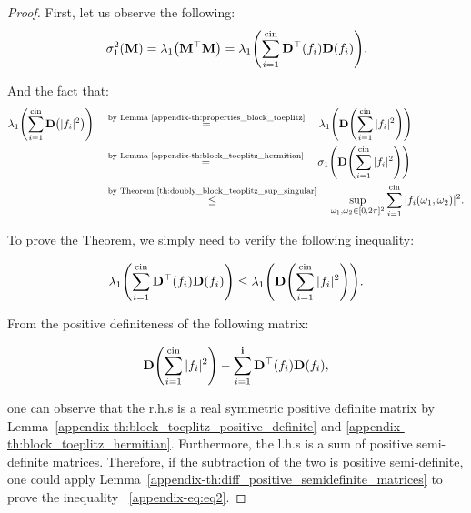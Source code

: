 \begin{proof}

First, let us observe the following:
\begin{equation}
    \sigma_1^2 \left( \mathbf{M} \right) = \lambda_1 \left( \mathbf{M}^{\top} \mathbf{M} \right) = \lambda_1 \left( \sum_{i=1}^{\cin} \mathbf{D}^{\top} \left(f_i \right) \mathbf{D} (f_i) \right).
\end{equation}

And the fact that:
\begin{align}
    \lambda_1 \left( \sum_{i=1}^{\cin} \mathbf{D} \left(|f_i|^2 \right) \right) \quad &\stackrel{\text{by Lemma~\ref{appendix-th:properties_block_toeplitz}}}{=} \quad \lambda_1 \left( \mathbf{D} \left( \sum_{i=1}^{\cin} |f_i|^2 \right) \right) \\ 
    \quad &\stackrel{\text{by Lemma~\ref{appendix-th:block_toeplitz_hermitian}}}{=} \quad \sigma_1 \left( \mathbf{D} \left( \sum_{i=1}^{\cin} |f_i|^2 \right) \right) \\
    \quad &\stackrel{\text{by Theorem~\ref{th:doubly_block_teoplitz_sup_singular}}}{\leq} \quad \sup_{\omega_1, \omega_2 \in [0, 2\pi]^2} \sum_{i=1}^{\cin} |f_i(\omega_1, \omega_2)|^2.
\end{align}

To prove the Theorem, we simply need to verify the following inequality:

\begin{equation}
    \lambda_1 \left( \sum_{i=1}^{\cin} \mathbf{D}^{\top} \left(f_i \right) \mathbf{D} (f_i) \right) \leq \lambda_1 \left( \mathbf{D} \left( \sum_{i=1}^{\cin} |f_i|^2 \right) \right). \label{appendix-eq:eq2}
\end{equation}

From the positive definiteness of the following matrix:

\begin{equation}
    \mathbf{D} \left( \sum_{i=1}^{\cin} |f_i|^2 \right) - \sum_{i=1}^{\ci} \mathbf{D}^{\top} \left(f_i \right) \mathbf{D} (f_i),
\end{equation}

one can observe that the r.h.s is a real symmetric positive definite matrix by Lemma~\ref{appendix-th:block_toeplitz_positive_definite} and \ref{appendix-th:block_toeplitz_hermitian}. Furthermore, the l.h.s is a sum of positive semi-definite matrices. Therefore, if the subtraction of the two is positive semi-definite, one could apply Lemma~\ref{appendix-th:diff_positive_semidefinite_matrices} to prove the inequality
~\ref{appendix-eq:eq2}. 



\end{proof}
